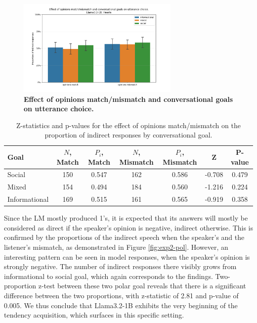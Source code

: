 \documentclass[11pt]{article}
\begin{document}
\begin{figure}[t]
    \centering
    \includegraphics[width=0.7\textwidth]{plots/speaker_experiment/llama3.2-1B_match.png}
    \caption{\textbf{Effect of opinions match/mismatch and conversational goals on utterance choice.}}
    \label{fig:exp2-match}
\end{figure}

\begin{table}[t]
    \centering
    \begin{tabular}{lcccccc}
        \toprule
        \textbf{Goal} & \textbf{$N$, Match} & \textbf{$P_i$, Match} & \textbf{$N$, Mismatch} & \textbf{$P_i$, Mismatch} & \textbf{Z} & \textbf{P-value} \\
        \midrule
        Social & 150 & 0.547 & 162 & 0.586 & -0.708 & 0.479 \\
        Mixed & 154 & 0.494 & 184 & 0.560 & -1.216 & 0.224 \\
        Informational & 169 & 0.515 & 161 & 0.565 & -0.919 & 0.358 \\
        \bottomrule
    \end{tabular}
    \caption{Z-statistics and p-values for the effect of opinions match/mismatch on the proportion of indirect responses by conversational goal.}
    \label{table:exp2-match}
\end{table}


Since the LM mostly produced 1's, it is expected that its answers will mostly be considered as direct if the speaker's opinion is negative, indirect otherwise. This is confirmed by the proportions of the indirect speech when the speaker's and the listener's mismatch, as demonstrated in Figure \ref{fig:exp2-pol}. However, an interesting pattern can be seen in model responses, when the speaker's opinion is strongly negative. The number of indirect responses there visibly grows from informational to social goal, which again corresponds to the findings. Two-proportion z-test between these two polar goal reveals that there is a significant difference between the two proportions, with z-statistic of 2.81 and p-value of 0.005. We thus conclude that Llama3.2-1B exhibits the very beginning of the tendency acquisition, which surfaces in this specific setting.
\end{document}
